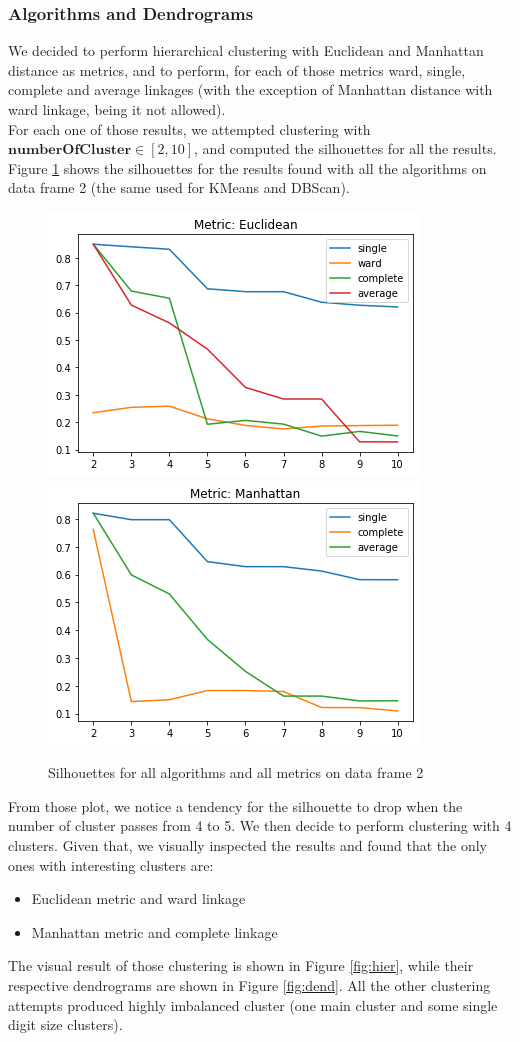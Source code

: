 \documentclass{article}
\begin{document}
	\subsubsection{Algorithms and Dendrograms}
	\label{sec:hier}
	We decided to perform hierarchical clustering with Euclidean and Manhattan distance as metrics, and to perform, for each of those metrics ward, single, complete and average linkages (with the exception of Manhattan distance with ward linkage, being it not allowed).\\
	For each one of those results, we attempted clustering with $\mathbf{numberOfCluster} \in [2, 10]$, and computed the silhouettes for all the results.
	Figure \ref{fig:silu} shows the silhouettes for the results found with all the algorithms on data frame 2 (the same used for KMeans and DBScan).
	\begin{figure}[]
		\centering
		\includegraphics[width=.35\textwidth]{silueuc}\hspace{1cm}
		\includegraphics[width=.35\textwidth]{siluman.png}
		\caption{Silhouettes for all algorithms and all metrics on data frame 2}
		\label{fig:silu}
	\end{figure}
	From those plot, we notice a tendency for the silhouette to drop when the number of cluster passes from 4 to 5. We then decide to perform clustering with 4 clusters.
	Given that, we visually inspected the results and found that the only ones with interesting clusters are:
	\begin{itemize}
		\item Euclidean metric and ward linkage
		\item Manhattan metric and complete linkage
	\end{itemize}
	The visual result of those clustering is shown in Figure \ref{fig:hier}, while their respective dendrograms are shown in Figure \ref{fig:dend}. All the other clustering attempts produced highly imbalanced cluster (one main cluster and some single digit size clusters).
\end{document}
